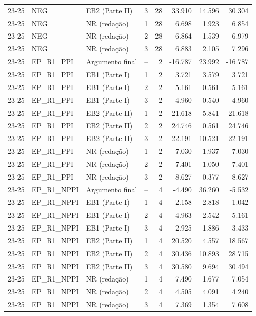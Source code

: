 \begin{longtable}{lllcrrrr}
23-25 & NEG & EB2 (Parte II) & 3 & 28 & 33.910 & 14.596 & 30.304 \\
23-25 & NEG & NR (redação) & 1 & 28 & 6.698 & 1.923 & 6.854 \\
23-25 & NEG & NR (redação) & 2 & 28 & 6.864 & 1.539 & 6.979 \\
23-25 & NEG & NR (redação) & 3 & 28 & 6.883 & 2.105 & 7.296 \\
23-25 & EP\_R1\_PPI & Argumento final & -- & 2 & -16.787 & 23.992 & -16.787 \\
23-25 & EP\_R1\_PPI & EB1 (Parte I) & 1 & 2 & 3.721 & 3.579 & 3.721 \\
23-25 & EP\_R1\_PPI & EB1 (Parte I) & 2 & 2 & 5.161 & 0.561 & 5.161 \\
23-25 & EP\_R1\_PPI & EB1 (Parte I) & 3 & 2 & 4.960 & 0.540 & 4.960 \\
23-25 & EP\_R1\_PPI & EB2 (Parte II) & 1 & 2 & 21.618 & 5.841 & 21.618 \\
23-25 & EP\_R1\_PPI & EB2 (Parte II) & 2 & 2 & 24.746 & 0.561 & 24.746 \\
23-25 & EP\_R1\_PPI & EB2 (Parte II) & 3 & 2 & 22.191 & 10.521 & 22.191 \\
23-25 & EP\_R1\_PPI & NR (redação) & 1 & 2 & 7.030 & 1.937 & 7.030 \\
23-25 & EP\_R1\_PPI & NR (redação) & 2 & 2 & 7.401 & 1.050 & 7.401 \\
23-25 & EP\_R1\_PPI & NR (redação) & 3 & 2 & 8.627 & 0.377 & 8.627 \\
23-25 & EP\_R1\_NPPI & Argumento final & -- & 4 & -4.490 & 36.260 & -5.532 \\
23-25 & EP\_R1\_NPPI & EB1 (Parte I) & 1 & 4 & 2.158 & 2.818 & 1.042 \\
23-25 & EP\_R1\_NPPI & EB1 (Parte I) & 2 & 4 & 4.963 & 2.542 & 5.161 \\
23-25 & EP\_R1\_NPPI & EB1 (Parte I) & 3 & 4 & 2.925 & 1.886 & 3.433 \\
23-25 & EP\_R1\_NPPI & EB2 (Parte II) & 1 & 4 & 20.520 & 4.557 & 18.567 \\
23-25 & EP\_R1\_NPPI & EB2 (Parte II) & 2 & 4 & 30.436 & 10.893 & 28.715 \\
23-25 & EP\_R1\_NPPI & EB2 (Parte II) & 3 & 4 & 30.580 & 9.694 & 30.494 \\
23-25 & EP\_R1\_NPPI & NR (redação) & 1 & 4 & 7.490 & 1.677 & 7.054 \\
23-25 & EP\_R1\_NPPI & NR (redação) & 2 & 4 & 4.505 & 4.091 & 4.240 \\
23-25 & EP\_R1\_NPPI & NR (redação) & 3 & 4 & 7.369 & 1.354 & 7.608 \\

\end{longtable}

